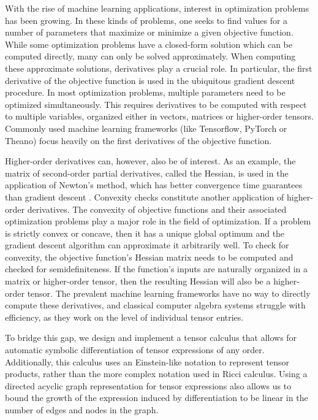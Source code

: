 \documentclass[12pt, a4paper]{report} %
\begin{document}
With the rise of machine learning applications, interest in optimization problems has been growing.
In these kinds of problems, one seeks to find values for a number of parameters that maximize or minimize a given objective function.
While some optimization problems have a closed-form solution which can be computed directly, many can only be solved approximately.
When computing these approximate solutions, derivatives play a crucial role.
In particular, the first derivative of the objective function is used in the ubiquitous gradient descent procedure.
In most optimization problems, multiple parameters need to be optimized simultaneously.
This requires derivatives to be computed with respect to multiple variables, organized either in vectors, matrices or higher-order tensors.
Commonly used machine learning frameworks (like Tensorflow, PyTorch or Theano) focus heavily on the first derivatives of the objective function.

Higher-order derivatives can, however, also be of interest.
As an example, the matrix of second-order partial derivatives, called the Hessian, is used in the application of Newton's method, which has better convergence time guarantees than gradient descent \cite{newtons}.
Convexity checks constitute another application of higher-order derivatives.
The convexity of objective functions and their associated optimization problems play a major role in the field of optimization.
If a problem is strictly convex or concave, then it has a unique global optimum and the gradient descent algorithm can approximate it arbitrarily well.
To check for convexity, the objective function's Hessian matrix needs to be computed and checked for semidefiniteness.
If the function's inputs are naturally organized in a matrix or higher-order tensor, then the resulting Hessian will also be a higher-order tensor.
The prevalent machine learning frameworks have no way to directly compute these derivatives, and classical computer algebra systems struggle with efficiency, as they work on the level of individual tensor entries.

To bridge this gap, we design and implement a tensor calculus that allows for automatic symbolic differentiation of tensor expressions of any order.
Additionally, this calculus uses an Einstein-like notation to represent tensor products, rather than the more complex notation used in Ricci calculus.
Using a directed acyclic graph representation for tensor expressions also allows us to bound the growth of the expression induced by differentiation to be linear in the number of edges and nodes in the graph.
\end{document}
